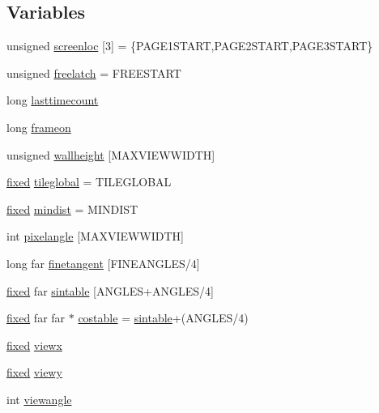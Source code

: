 \subsection*{Variables}
\begin{DoxyCompactItemize}
\item 
unsigned \hyperlink{WL__DRAW_8C_a7f19075ffe97f9380ab35be486017cd0}{screenloc} \mbox{[}3\mbox{]} = \{PAGE1START,PAGE2START,PAGE3START\}
\item 
unsigned \hyperlink{WL__DRAW_8C_a98fdbc277691b144bd2fcbceec9047f9}{freelatch} = FREESTART
\item 
long \hyperlink{WL__DRAW_8C_a9833356b947444f0974c777f47e6ce42}{lasttimecount}
\item 
long \hyperlink{WL__DRAW_8C_ab2f38827113d9825faddb387c5e3994d}{frameon}
\item 
unsigned \hyperlink{WL__DRAW_8C_a9bae25635a51ae6d6ed9884e6cb79559}{wallheight} \mbox{[}MAXVIEWWIDTH\mbox{]}
\item 
\hyperlink{WL__DEF_8H_aaf54715c9b83afe8794059fcf5fd5e7e}{fixed} \hyperlink{WL__DRAW_8C_ab864b51e17df4138d9cb8e5549825c3f}{tileglobal} = TILEGLOBAL
\item 
\hyperlink{WL__DEF_8H_aaf54715c9b83afe8794059fcf5fd5e7e}{fixed} \hyperlink{WL__DRAW_8C_adda35a0f8f0b097ae880615265d9f8a7}{mindist} = MINDIST
\item 
int \hyperlink{WL__DRAW_8C_aa755d04de2f60c0b855462660c83b8af}{pixelangle} \mbox{[}MAXVIEWWIDTH\mbox{]}
\item 
long far \hyperlink{WL__DRAW_8C_affbee62526a1ad946f1d5c2b2c26331b}{finetangent} \mbox{[}FINEANGLES/4\mbox{]}
\item 
\hyperlink{WL__DEF_8H_aaf54715c9b83afe8794059fcf5fd5e7e}{fixed} far \hyperlink{WL__DRAW_8C_a26ed7ba128175f995c2eb9f38f2590bd}{sintable} \mbox{[}ANGLES+ANGLES/4\mbox{]}
\item 
\hyperlink{WL__DEF_8H_aaf54715c9b83afe8794059fcf5fd5e7e}{fixed} far far $\ast$ \hyperlink{WL__DRAW_8C_af8ca9927f66a9bc35f3b160229131e1d}{costable} = \hyperlink{WL__DRAW_8C_a26ed7ba128175f995c2eb9f38f2590bd}{sintable}+(ANGLES/4)
\item 
\hyperlink{WL__DEF_8H_aaf54715c9b83afe8794059fcf5fd5e7e}{fixed} \hyperlink{WL__DRAW_8C_afb516c78f435a37fab0a0a7b975ff4d9}{viewx}
\item 
\hyperlink{WL__DEF_8H_aaf54715c9b83afe8794059fcf5fd5e7e}{fixed} \hyperlink{WL__DRAW_8C_a0ebb891d97bc41244012d2b8d7458f22}{viewy}
\item 
int \hyperlink{WL__DRAW_8C_a3018b2f6c2d45eb33e8c894301d545df}{viewangle}

\end{DoxyCompactItemize}
